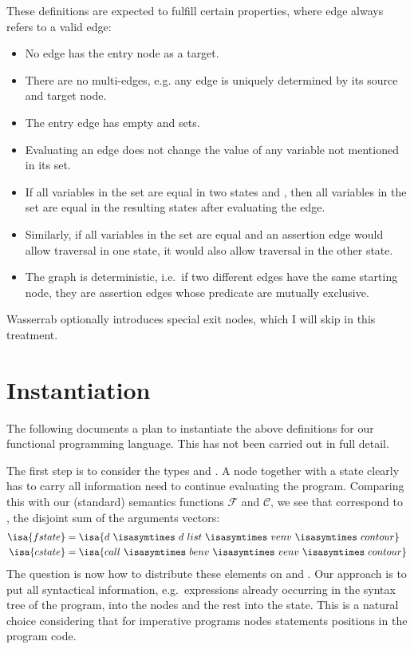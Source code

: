 \documentclass[a4paper,halfparskip,DIV=10,11pt]{scrbook}
\newcommand{\C}{\mathcal C}
\newcommand{\F}{\mathcal F}
\begin{document}
\pagebreak[2]
These definitions are expected to fulfill certain properties, where edge always refers to a valid edge:
\begin{itemize}
\item No edge has the entry node as a target. 
\item There are no multi-edges, e.g. any edge is uniquely determined by its source and target node.
\item The entry edge has empty  and  sets.
\item Evaluating an edge does not change the value of any variable not mentioned in its  set.
\item If all variables in the  set are equal in two states  and , then all variables in the  set are equal in the resulting states after evaluating the edge.
\item Similarly, if all variables in the  set are equal and an assertion edge would allow traversal in one state, it would also allow traversal in the other state.
\item The graph is deterministic, i.e.\ if two different edges have the same starting node, they are assertion edges whose predicate are mutually exclusive.
\end{itemize}
Wasserrab optionally introduces special exit nodes, which I will skip in this treatment.

\section{Instantiation}

The following documents a plan to instantiate the above definitions for our functional programming language. This has not been carried out in full detail.

The first step is to consider the types  and . A node together with a state clearly has to carry all information need to continue evaluating the program. Comparing this with our (standard) semantics functions $\F$ and $\C$, we see that  correspond to , the disjoint sum of the arguments vectors:
\begin{align*}
\isa{fstate} &= \isa{d\ \isasymtimes\ d\ list\ \isasymtimes\ venv\ \isasymtimes\ contour}\\
\isa{cstate} &= \isa{call\ \isasymtimes\ benv\ \isasymtimes\ venv\ \isasymtimes\ contour}
\end{align*}
The question is now how to distribute these elements on  and . Our approach is to put all syntactical information, e.g.\ expressions already occurring in the syntax tree of the program, into the nodes and the rest into the state. This is a natural choice considering that for imperative programs nodes statements positions in the program code.
\end{document}

